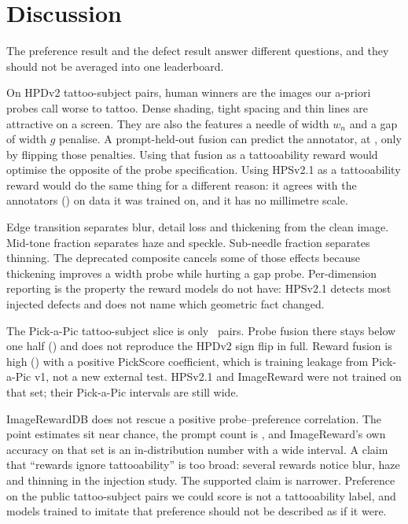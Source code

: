 \section{Discussion}
\label{sec:discussion}

The preference result and the defect result answer different questions, and they should not be averaged into one leaderboard.

On HPDv2 tattoo-subject pairs, human winners are the images our a-priori probes call worse to tattoo.
Dense shading, tight spacing and thin lines are attractive on a screen.
They are also the features a needle of width $w_n$ and a gap of width $g$ penalise.
A prompt-held-out fusion can predict the annotator, at \FusHpdProbespreregisteredAcc, only by flipping those penalties.
Using that fusion as a tattooability reward would optimise the opposite of the probe specification.
Using HPSv2.1 as a tattooability reward would do the same thing for a different reason: it agrees with the annotators (\HpdHpstwoAcc) on data it was trained on, and it has no millimetre scale.

Edge transition separates blur, detail loss and thickening from the clean image.
Mid-tone fraction separates haze and speckle.
Sub-needle fraction separates thinning.
The deprecated composite cancels some of those effects because thickening improves a width probe while hurting a gap probe.
Per-dimension reporting is the property the reward models do not have: HPSv2.1 detects most injected defects and does not name which geometric fact changed.

The Pick-a-Pic tattoo-subject slice is only \PapHpstwoN\ pairs.
Probe fusion there stays below one half (\FusPapProbespreregisteredAcc) and does not reproduce the HPDv2 sign flip in full.
Reward fusion is high (\FusPapRewardsAcc) with a positive PickScore coefficient, which is training leakage from Pick-a-Pic v1, not a new external test.
HPSv2.1 and ImageReward were not trained on that set; their Pick-a-Pic intervals are still wide.

ImageRewardDB does not rescue a positive probe--preference correlation.
The point estimates sit near chance, the prompt count is \NIrTsprompts, and ImageReward's own accuracy on that set is an in-distribution number with a wide interval.
A claim that ``rewards ignore tattooability'' is too broad: several rewards notice blur, haze and thinning in the injection study.
The supported claim is narrower.
Preference on the public tattoo-subject pairs we could score is not a tattooability label, and models trained to imitate that preference should not be described as if it were.


